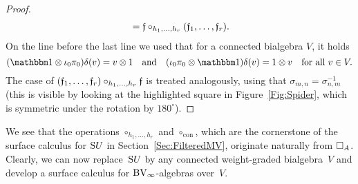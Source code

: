 \documentclass[\MainFolder/Text.tex]{subfiles}
\begin{document}
\begin{proof}
\begin{align*}
&\quad=\mathfrak{f}\circ_{h_1, \dotsc, h_r}(\mathfrak{f}_1, \dotsc, \mathfrak{f}_r).
\end{align*}
On the line before the last line we used that for a connected bialgebra $V$, it holds
\[ (\Id\otimes\iota_0\pi_0)\MVCoProd(v)=v\otimes 1\quad\text{and}\quad (\iota_0\pi_0\otimes\Id)\MVCoProd(v) = 1 \otimes v\quad\text{for all }v\in V.\]
The case of $(\mathfrak{f}_{1},\dotsc,\mathfrak{f}_r)\circ_{h_1,\dotsc,h_r}\mathfrak{f}$ is treated analogously, using that $\sigma_{m,n} = \sigma_{n,m}^{-1}$ (this is visible by looking at the highlighted square in Figure~\ref{Fig:Spider}, which is symmetric under the rotation by $180^\circ$).
\end{proof}

We see that the operations $\circ_{h_1,\dotsc,h_r}$ and $\circ_{\mathrm{con}}$, which are the cornerstone of the surface calculus for $\mathrm{S} U$ in Section~\ref{Sec:FilteredMV}, originate naturally from $\SquareComp_A$. Clearly, we can now replace~$\mathrm{S} U$ by any connected weight-graded bialgebra~$V$ and develop a surface calculus for $\mathrm{BV}_\infty$-algebras over~$V$.
\end{document}
